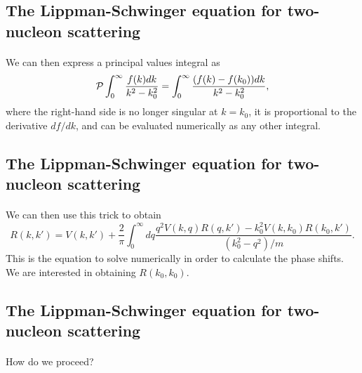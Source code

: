 \documentclass[%
twoside,                 %
final,                   %
10pt]{article}
\begin{document}
\subsection*{The Lippman-Schwinger equation for two-nucleon scattering}

\paragraph{}
We can then express a principal values integral
as
\begin{equation}
  {\cal P}\int_{0}^{\infty} \frac{f(k)dk}{k^2-k_0^2} =
  \int_{0}^{\infty} \frac{(f(k)-f(k_0))dk}{k^2-k_0^2},
   \label{eq:trick}
\end{equation}
where the right-hand side is no longer singular at 
$k=k_0$, it is proportional to the derivative $df/dk$,
and can be evaluated numerically as any other integral.



\subsection*{The Lippman-Schwinger equation for two-nucleon scattering}

\paragraph{}
We can then use this trick to obtain
\begin{equation}
    R(k,k') = V(k,k') +\frac{2}{\pi}
                \int_0^{\infty}dq
                \frac{q^2V(k,q)R(q,k')-k_0^2V(k,k_0)R(k_0,k')  }
                     {(k_0^2-q^2)/m}.
   \label{eq:ls2}
\end{equation}
This is the equation to solve numerically in order
to calculate the phase shifts. We are interested in obtaining
$R(k_0,k_0)$.



\subsection*{The Lippman-Schwinger equation for two-nucleon scattering}

\paragraph{}
How do we proceed?
\end{document}
